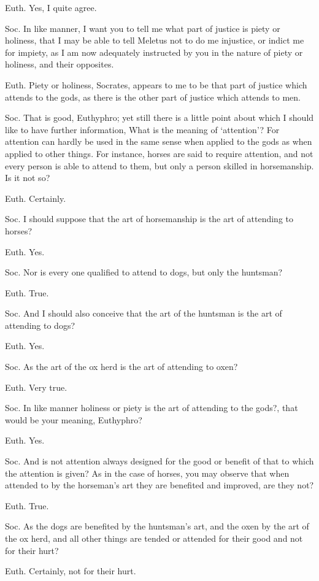 Euth. Yes, I quite agree.

Soc. In like manner, I want you to tell me what part of justice is piety or holiness, that I may be able to tell Meletus not to do me injustice, or indict me for impiety, as I am now adequately instructed by you in the nature of piety or holiness, and their opposites.

Euth. Piety or holiness, Socrates, appears to me to be that part of justice which attends to the gods, as there is the other part of justice which attends to men.

Soc. That is good, Euthyphro; yet still there is a little point about which I should like to have further information, What is the meaning of `attention'? For attention can hardly be used in the same sense when applied to the gods as when applied to other things. For instance, horses are said to require attention, and not every person is able to attend to them, but only a person skilled in horsemanship. Is it not so?

Euth. Certainly.

Soc. I should suppose that the art of horsemanship is the art of attending to horses?

Euth. Yes.

Soc. Nor is every one qualified to attend to dogs, but only the huntsman?

Euth. True.

Soc. And I should also conceive that the art of the huntsman is the art of attending to dogs?

Euth. Yes.

Soc. As the art of the ox herd is the art of attending to oxen?

Euth. Very true.

Soc. In like manner holiness or piety is the art of attending to the gods?, that would be your meaning, Euthyphro?

Euth. Yes.

Soc. And is not attention always designed for the good or benefit of that to which the attention is given? As in the case of horses, you may observe that when attended to by the horseman's art they are benefited and improved, are they not?

Euth. True.

Soc. As the dogs are benefited by the huntsman's art, and the oxen by the art of the ox herd, and all other things are tended or attended for their good and not for their hurt?

Euth. Certainly, not for their hurt.

